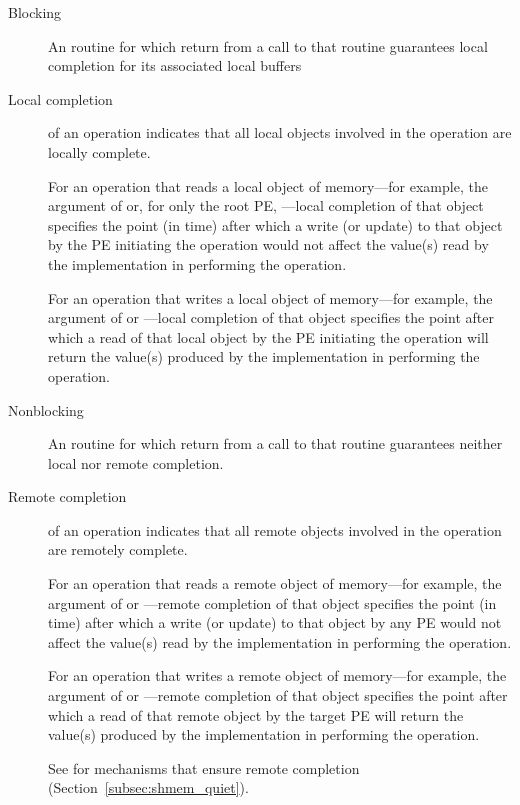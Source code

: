 \begin{description}

\item[Blocking] An \openshmem routine for which return from a call to
  that routine guarantees local completion for its associated local
  buffers

\item[Local completion] of an \openshmem operation indicates that all
  local objects involved in the operation are locally complete.

  For an \openshmem operation that reads a local object of
  memory---for example, the \source{} argument of 
  or, for only the root \ac{PE}, ---local
  completion of that object specifies the point (in time) after which
  a write (or update) to that object by the \ac{PE} initiating the
  operation would not affect the value(s) read by the \openshmem
  implementation in performing the operation.

  For an \openshmem operation that writes a local object of
  memory---for example, the \dest{} argument of  or
  ---local completion of that object
  specifies the point after which a read of that local object by the
  \ac{PE} initiating the operation will return the value(s) produced
  by the \openshmem implementation in performing the operation.

\item[Nonblocking] An \openshmem routine for which return from a call
  to that routine guarantees neither local nor remote completion.

\item[Remote completion] of an \openshmem operation indicates that all
  remote objects involved in the operation are remotely complete.

  For an \openshmem operation that reads a remote object of
  memory---for example, the \source{} argument of  or
  ---remote completion of that object
  specifies the point (in time) after which a write (or update) to
  that object by any \ac{PE} would not affect the value(s) read by the
  \openshmem implementation in performing the operation.

  For an \openshmem operation that writes a remote object of
  memory---for example, the \dest{} argument of  or
  ---remote completion of that object
  specifies the point after which a read of that remote object by the
  target \ac{PE} will return the value(s) produced by the \openshmem
  implementation in performing the operation.

  See  for mechanisms that ensure remote completion
  (Section~\ref{subsec:shmem_quiet}).

\end{description}
